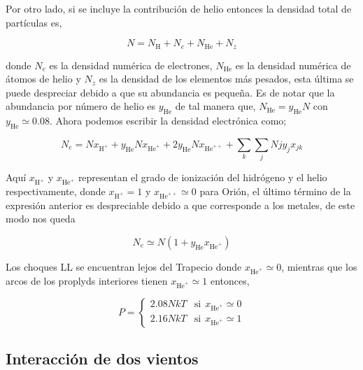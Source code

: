 Por otro lado, si se incluye la contribución de helio entonces la densidad total de partículas es,

\begin{equation*}
  \label{eq:particulas}
  N = N_{\text{H}} + N_{e} + N_{\text{He}} + N_{z}
\end{equation*}

donde \(N_{e}\) es la densidad numérica de electrones, \(N_{\text{He}}\) es la densidad numérica de átomos de helio y \(N_{z}\) es la densidad de los elementos más pesados, esta última se puede despreciar debido a que su abundancia es pequeña. Es de notar que la abundancia por número de helio es \(y_{\text{He}}\) de tal manera que, \(N_{\text{He}} = y_{\text{He}} N\) con \(y_{\text{He}} \simeq 0.08\). Ahora podemos escribir la densidad electrónica como;

\begin{equation*}
  \label{eq:densidad-electronica}
  N_{e}=Nx_{\text{H}^{+}} + y_{\text{He}}Nx_{\text{He}^{+}} + 2 y_{\text{He}}Nx_{\text{He}^{++}} + \sum_{k} \sum_{j}Njy_{j}x_{jk}
\end{equation*}

Aquí \(x_{\text{H}^{+}}\) y \(x_{\text{He}^{+}}\) representan el grado de ionización del hidrógeno y el helio respectivamente, donde \(x_{\text{H}^{+}}=1\) y \(x_{\text{He}^{++}} \simeq 0\) para Orión, el último término de la expresión anterior es despreciable debido a que corresponde a los metales, de este modo nos queda

\begin{equation*}
  \label{eq:density}
  N_{e} \simeq N(1 +  y_{\text{He}}x_{\text{He}^{+}})
\end{equation*}

 Los choques LL se encuentran lejos del Trapecio donde \(x_{\text{He}^{+}} \simeq 0\), mientras que los arcos de los proplyds interiores tienen \(x_{\text{He}^{+}} \simeq 1\)  entonces,

\begin{equation}
  \label{eq:pressure}
  P =  \left\{ \begin{array}{ll}
  2.08 N k T  & \mathrm{si} ~~ \mbox{$x_{\text{He}^{+}} \simeq 0$}\\
  2.16 N k T  & \mathrm{si} ~~ \mbox{$x_{\text{He}^{+}} \simeq 1$}
 \end{array}
 \right.
\end{equation}

\subsection{Interacción de dos vientos}
\label{sec:interaction}

